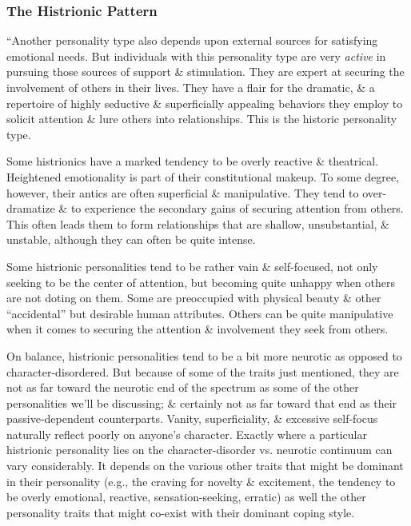 \documentclass{article}
\numberwithin{equation}{section}
\begin{document}
\subsubsection{The Histrionic Pattern}
``Another personality type also depends upon external sources for satisfying emotional needs. But individuals with this personality type are very \textit{active} in pursuing those sources of support \& stimulation. They are expert at securing the involvement of others in their lives. They have a flair for the dramatic, \& a repertoire of highly seductive \& superficially appealing behaviors they employ to solicit attention \& lure others into relationships. This is the historic personality type.

Some histrionics have a marked tendency to be overly reactive \& theatrical. Heightened emotionality is part of their constitutional makeup. To some degree, however, their antics are often superficial \& manipulative. They tend to over-dramatize \& to experience the secondary gains of securing attention from others. This often leads them to form relationships that are shallow, unsubstantial, \& unstable, although they can often be quite intense.

Some histrionic personalities tend to be rather vain \& self-focused, not only seeking to be the center of attention, but becoming quite unhappy when others are not doting on them. Some are preoccupied with physical beauty \& other ``accidental'' but desirable human attributes. Others can be quite manipulative when it comes to securing the attention \& involvement they seek from others.

On balance, histrionic personalities tend to be a bit more neurotic as opposed to character-disordered. But because of some of the traits just mentioned, they are not as far toward the neurotic end of the spectrum as some of the other personalities we'll be discussing; \& certainly not as far toward that end as their passive-dependent counterparts. Vanity, superficiality, \& excessive self-focus naturally reflect poorly on anyone's character. Exactly where a particular histrionic personality lies on the character-disorder vs. neurotic continuum can vary considerably. It depends on the various other traits that might be dominant in their personality (e.g., the craving for novelty \& excitement, the tendency to be overly emotional, reactive, sensation-seeking, erratic) as well the other personality traits that might co-exist with their dominant coping style.
\end{document}
